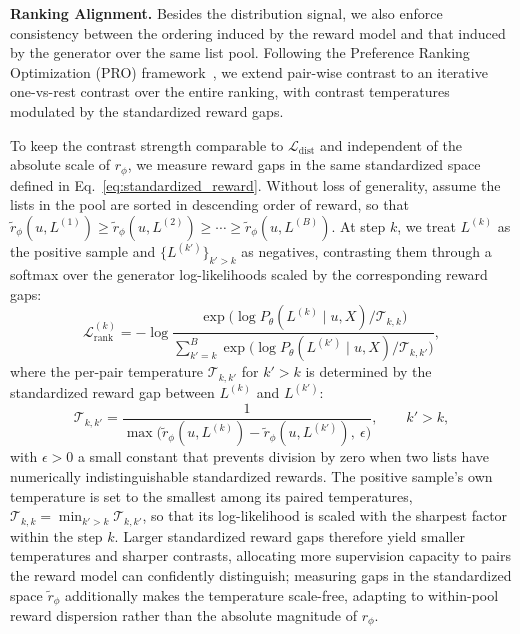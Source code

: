 \documentclass[sigconf]{acmart}
\begin{document}
\vspace{0.5em}
\noindent\textbf{Ranking Alignment.}
Besides the distribution signal, we also enforce consistency between the ordering induced by the reward model and that induced by the generator over the same list pool. Following the Preference Ranking Optimization (PRO) framework~\cite{song2024preference}, we extend pair-wise contrast to an iterative one-vs-rest contrast over the entire ranking, with contrast temperatures modulated by the standardized reward gaps.

To keep the contrast strength comparable to $\mathcal{L}_{\mathrm{dist}}$ and independent of the absolute scale of $r_\phi$, we measure reward gaps in the same standardized space defined in Eq.~\eqref{eq:standardized_reward}. Without loss of generality, assume the lists in the pool are sorted in descending order of reward, so that $\tilde{r}_\phi(u, L^{(1)}) \geq \tilde{r}_\phi(u, L^{(2)}) \geq \cdots \geq
\tilde{r}_\phi(u, L^{(B)})$. At step $k$, we treat $L^{(k)}$ as the positive sample and $\{L^{(k')}\}_{k' > k}$ as negatives, contrasting them through a softmax over the generator log-likelihoods scaled by the corresponding reward gaps:
\begin{equation}
\label{eq:pro_step}
\mathcal{L}_{\mathrm{rank}}^{(k)} = -\log \frac{\exp\!\bigl( \log P_\theta(L^{(k)} \mid u, X) \big/ \mathcal{T}_{k,k} \bigr)
}{\sum_{k' = k}^{B} \exp\!\bigl( \log P_\theta(L^{(k')} \mid u, X) \big/ \mathcal{T}_{k,k'} \bigr)},
\end{equation}
where the per-pair temperature $\mathcal{T}_{k,k'}$ for $k' > k$ is determined by the standardized reward gap between $L^{(k)}$ and $L^{(k')}$:
\begin{equation}
\mathcal{T}_{k,k'} = 
\frac{1}{\max\bigl(\tilde{r}_\phi(u, L^{(k)}) - \tilde{r}_\phi(u, L^{(k')}),\ \epsilon\bigr)}, 
\qquad k' > k,
\end{equation}
with $\epsilon > 0$ a small constant that prevents division by zero when two lists have numerically indistinguishable standardized rewards. The positive sample's own temperature is set to the smallest among its paired temperatures, $\mathcal{T}_{k,k} = \min_{k' > k} \mathcal{T}_{k,k'}$, so that its log-likelihood is scaled with the sharpest factor within the step $k$. Larger standardized reward gaps therefore yield smaller temperatures and sharper contrasts, allocating more supervision capacity to pairs the reward model can confidently distinguish; measuring gaps in the standardized space $\tilde{r}_\phi$ additionally makes the temperature scale-free, adapting to within-pool reward dispersion rather than the absolute magnitude of $r_\phi$.
\end{document}
